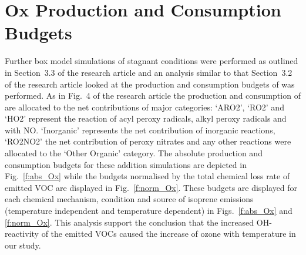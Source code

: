 \documentclass[11pt,a4paper]{article}
\begin{document}
\section{Ox Production and Consumption Budgets}
\vspace{-2mm}
Further box model simulations of stagnant conditions were performed as outlined in Section~3.3 of the research article and an analysis similar to that Section~3.2 of the research article looked at the production and consumption budgets of  was performed.
As in Fig.~4 of the research article the production and consumption of  are allocated to the net contributions of major categories: `ARO2', `RO2' and `HO2' represent the reaction of acyl peroxy radicals, alkyl peroxy radicals and  with NO.
`Inorganic' represents the net contribution of inorganic reactions, `RO2NO2' the net contribution of peroxy nitrates and any other reactions were allocated to the `Other Organic' category.
The absolute  production and consumption budgets for these addition simulations are depicted in Fig.~\ref{f:abs_Ox} while the  budgets normalised by the total chemical loss rate of emitted VOC are displayed in Fig.~\ref{f:norm_Ox}.
These  budgets are displayed for each chemical mechanism,  condition and source of isoprene emissions (temperature independent and temperature dependent) in Figs.~\ref{f:abs_Ox} and \ref{f:norm_Ox}.
This analysis support the conclusion that the increased OH-reactivity of the emitted VOCs caused the increase of ozone with temperature in our study.
\end{document}
